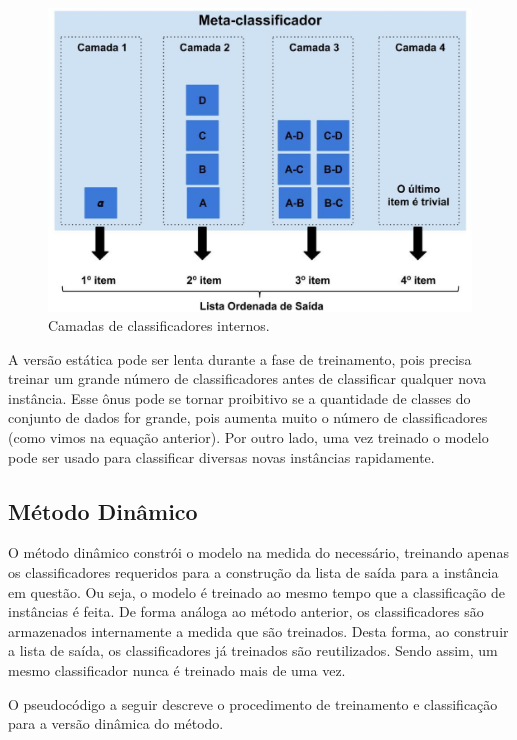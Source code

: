 \begin{figure}[h!]
  \includegraphics[width=\linewidth]{images/metodoproposto03.eps}
  \caption{Camadas de classificadores internos.}
  \label{fig:metodoproposto03}
\end{figure}

A versão estática pode ser lenta durante a fase de treinamento, pois precisa treinar um grande número de classificadores antes de classificar qualquer nova instância. 
Esse ônus pode se tornar proibitivo se a quantidade de classes do conjunto de dados for grande, pois aumenta muito o número de classificadores (como vimos na equação anterior).
Por outro lado, uma vez treinado o modelo pode ser usado para classificar diversas novas instâncias rapidamente.

\subsection{Método Dinâmico}

O método dinâmico constrói o modelo na medida do necessário, treinando apenas os classificadores requeridos para a construção da lista de saída para a instância em questão. Ou seja, o modelo é treinado ao mesmo tempo que a classificação de instâncias é feita. De forma análoga ao método anterior, os classificadores são armazenados internamente a medida que são treinados. Desta forma, ao construir a lista de saída, os classificadores já treinados são reutilizados. Sendo assim, um mesmo classificador nunca é treinado mais de uma vez. 

O pseudocódigo a seguir descreve o procedimento de treinamento e classificação para a versão dinâmica do método.
\\

